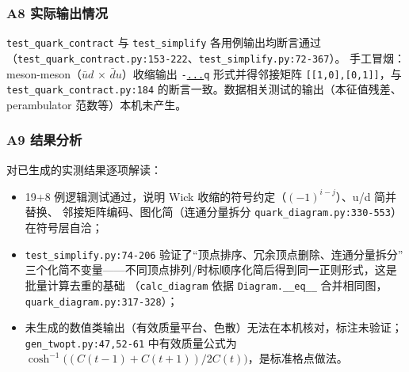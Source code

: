 \documentclass[UTF8]{ctexart}
\begin{document}
\subsubsection{A8 实际输出情况}
\texttt{test\_quark\_contract} 与 \texttt{test\_simplify} 各用例输出均断言通过
（\texttt{\nolinkurl{test_quark_contract.py:153-222}}、\texttt{\nolinkurl{test_simplify.py:72-367}}）。
手工冒烟：meson-meson（$\bar u d$ × $\bar d u$）收缩输出
\texttt{-\url{...}q} 形式并得邻接矩阵 \texttt{[[1,0],[0,1]]}，与
\texttt{test\_quark\_contract.py:184} 的断言一致。数据相关测试的输出（本征值残差、
perambulator 范数等）本机未产生。

\subsubsection{A9 结果分析}
对已生成的实测结果逐项解读：
\begin{itemize}
\item 19+8 例逻辑测试通过，说明 Wick 收缩的符号约定（$(-1)^{i-j}$）、u/d 简并替换、
邻接矩阵编码、图化简（连通分量拆分 \texttt{quark\_diagram.py:330-553}）在符号层自洽；
\item \texttt{test\_simplify.py:74-206} 验证了``顶点排序、冗余顶点删除、连通分量拆分''
三个化简不变量——不同顶点排列/时标顺序化简后得到同一正则形式，这是批量计算去重的基础
（\texttt{calc\_diagram} 依据 \texttt{Diagram.\_\_eq\_\_} 合并相同图，\texttt{\nolinkurl{quark_diagram.py:317-328}}）；
\item 未生成的数值类输出（有效质量平台、色散）无法在本机核对，标注\textcolor{warn}{未验证}；
\texttt{\nolinkurl{gen_twopt.py:47,52-61}} 中有效质量公式为
$\cosh^{-1}\big((C(t-1)+C(t+1))/2C(t)\big)$，是标准格点做法。
\end{itemize}
\end{document}
